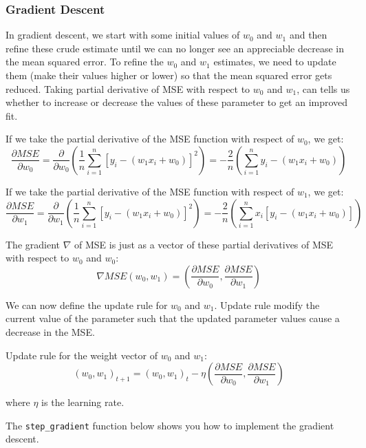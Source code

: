 \documentclass[11pt]{article}
\begin{document}
    \hypertarget{gradient-descent}{%
\subsubsection{Gradient Descent}\label{gradient-descent}}

In gradient descent, we start with some initial values of \(w_0\) and
\(w_1\) and then refine these crude estimate until we can no longer see
an appreciable decrease in the mean squared error. To refine the \(w_0\)
and \(w_1\) estimates, we need to update them (make their values higher
or lower) so that the mean squared error gets reduced. Taking partial
derivative of MSE with respect to \(w_0\) and \(w_1\), can tells us
whether to increase or decrease the values of these parameter to get an
improved fit.

If we take the partial derivative of the MSE function with respect of
\(w_0\), we get: \[
\frac{\partial MSE}{\partial w_0} =\frac{\partial}{\partial w_0} \left(\dfrac{1}{n} \sum_{i=1}^{n} [y_i - (w_1 x_i + w_0)]^2\right)
=-\dfrac{2}{n}\left( \sum_{i=1}^{n} y_i - (w_1 x_i + w_0)\right)
\]

If we take the partial derivative of the MSE function with respect of
\(w_1\), we get: \[
\frac{\partial MSE}{\partial w_1} =\frac{\partial}{\partial w_1} \left(\dfrac{1}{n} \sum_{i=1}^{n} [y_i - (w_1 x_i + w_0)]^2\right) 
=-\dfrac{2}{n}\left( \sum_{i=1}^{n} x_i[y_i - (w_1 x_i + w_0)]\right)
\]

The gradient \(\nabla\) of MSE is just as a vector of these partial
derivatives of MSE with respect to \(w_0\) and \(w_0\): \[
\nabla MSE(w_0, w_1) = \left(\frac{\partial MSE}{\partial w_0}, \frac{\partial MSE}{\partial w_1}\right)
\]

We can now define the update rule for \(w_0\) and \(w_1\). Update rule
modify the current value of the parameter such that the updated
parameter values cause a decrease in the MSE.

Update rule for the weight vector of \(w_0\) and \(w_1\): \[
(w_0, w_1)_{t+1} =(w_0, w_1)_{t} - \eta \left(\frac{\partial MSE}{\partial w_0}, \frac{\partial MSE}{\partial w_1}\right)
\]

where \(\eta\) is the learning rate.

The \texttt{step\_gradient} function below shows you how to implement
the gradient descent.
\end{document}
